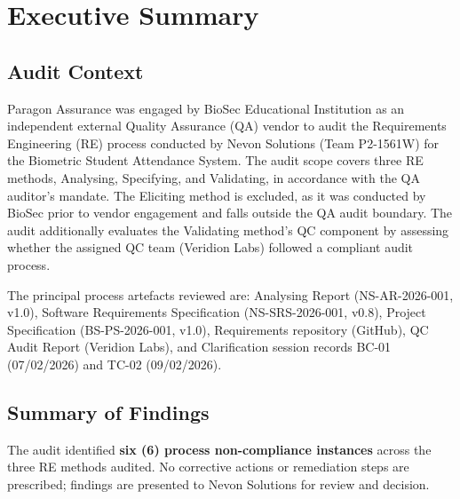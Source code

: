 \documentclass[11pt,a4paper]{article}
\renewcommand{\headrulewidth}{0.4pt}
\begin{document}
\restoregeometry
\newpage

\pagestyle{fancy}
\fancyhf{}
\cfoot{\thepage}
\renewcommand{\headrulewidth}{0.4pt}
\setlength{\headheight}{20pt}

\tableofcontents
\newpage

\section{Executive Summary}

\subsection{Audit Context}

Paragon Assurance was engaged by BioSec Educational Institution as an independent external Quality Assurance (QA) vendor to audit the Requirements Engineering (RE) process conducted by Nevon Solutions (Team P2-1561W) for the Biometric Student Attendance System. The audit scope covers three RE methods, Analysing, Specifying, and Validating, in accordance with the QA auditor's mandate. The Eliciting method is excluded, as it was conducted by BioSec prior to vendor engagement and falls outside the QA audit boundary. The audit additionally evaluates the Validating method's QC component by assessing whether the assigned QC team (Veridion Labs) followed a compliant audit process.

The principal process artefacts reviewed are: Analysing Report (NS-AR-2026-001, v1.0), Software Requirements Specification (NS-SRS-2026-001, v0.8), Project Specification (BS-PS-2026-001, v1.0), Requirements repository (GitHub), QC Audit Report (Veridion Labs), and Clarification session records BC-01 (07/02/2026) and TC-02 (09/02/2026).

\subsection{Summary of Findings}

The audit identified \textbf{six (6) process non-compliance instances} across the three RE methods audited. No corrective actions or remediation steps are prescribed; findings are presented to Nevon Solutions for review and decision.
\end{document}
